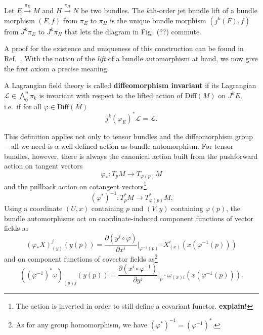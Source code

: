 \begin{definition}
  Let $E \overset{\pi_E}{\longrightarrow} M$ and $H \overset{\pi_H}{\longrightarrow} N$ be two bundles. The $k$th-order jet bundle lift of a bundle morphism $(F,f)$ from $\pi_E$ to $\pi_H$ is the unique bundle morphism $(j^k(F),f)$ from $J^k\pi_E$ to $J^k\pi_H$ that lets the diagram in Fig.~(??) commute.
\end{definition}
A proof for the existence and uniqueness of this construction can be found in Ref.~\cite{saunders}. With the notion of the \emph{lift} of a bundle automorphism at hand, we now give the first axiom a precise meaning
\begin{definition}
  A Lagrangian field theory is called \textbf{diffeomorphism invariant} if its Lagrangian $\mathscr L\in\textstyle\bigwedge_0^n\pi_k$ is invariant with respect to the lifted action of $\mathrm{Diff}(M)$ on $J^kE$, i.e.~if for all $\varphi\in\mathrm{Diff}(M)$
  \begin{equation}\label{lagrangian_diffeo_invariance}
    j^k(\varphi_E)^\ast \mathscr L = \mathscr L.
  \end{equation}
\end{definition}
This definition applies not only to tensor bundles and the diffeomorphism group---all we need is a well-defined action as bundle automorphism. For tensor bundles, however, there is always the canonical action built from the pushforward action on tangent vectors
\begin{equation}
  \varphi_\ast\colon T_pM\rightarrow T_{\varphi(p)}M
\end{equation}
and the pullback action on cotangent vectors\footnote{The action is inverted in order to still define a covariant functor. \textbf{explain!}\cite{}}
\begin{equation}
   (\varphi^\ast)^{-1}\colon T^\ast_pM\rightarrow T^\ast_{\varphi(p)}M.
\end{equation}
Using a coordinate $(U,x)$ containing $p$ and $(V,y)$ containing $\varphi(p)$, the bundle automorphisms act on coordinate-induced component functions of vector fields as
\begin{equation}\label{diffeo_vector_coordinates}
(\varphi_\ast X)_{(y)}^j(y(p)) = \frac{\partial (y^j\circ \varphi)}{\partial x^i} \Bigg\rvert_{\varphi^{-1}(p)} \cdot X_{(x)}^i(x(\varphi^{-1}(p)))
\end{equation}
and on component functions of covector fields as\footnote{As for any group homomorphism, we have $(\varphi^\ast)^{-1}=(\varphi^{-1})^\ast$.}
\begin{equation}\label{diffeo_covector_coordinates}
((\varphi^{-1})^\ast\omega)_{(y)j}(y(p)) = \frac{\partial (x^i\circ \varphi^{-1})}{\partial y^j}\Bigg\rvert_p \cdot \omega_{(x)i}(x(\varphi^{-1}(p))).
\end{equation}

